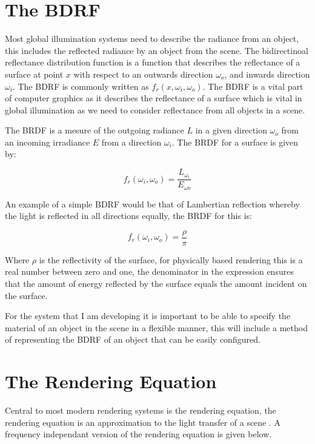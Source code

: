 \section{The BDRF}
\label{sec:bdrf}
Most global illumination systems need to describe the radiance from an object, this includes the
reflected radiance by an object from the scene.
The bidirectinoal reflectance distribution function \cite{Nicodemus65}is a function that describes 
the reflectance of a surface at point $x$ with respect to an outwards direction $\omega_{o}$, and 
inwards direction $\omega_{i}$. The BDRF is commonly written as $f_{r}(x, \omega_{i},\omega_{o})$. 
The BDRF is a vital part of computer graphics as it describes the reflectance of a surface which is 
vital in global illumination as we need to consider reflectance from all objects in a scene.

The BRDF is a mesure of the outgoing radiance $L$ in a given direction $\omega_{o}$ from an incoming
irradiance $E$ from a direction $\omega_{i}$. The BRDF for a surface is given by:

\begin{equation}
f_{r}(\omega_{i}, \omega_{o}) = \frac{L_{\omega_{i}}}{E_{\omega{o}}}
\end{equation}

An example of a simple BDRF would be that of Lambertian reflection whereby the light is reflected
in all directions equally, the BRDF for this is:

\begin{equation}
f_{r}(\omega_{i}, \omega_{o}) = \frac{\rho}{\pi}
\end{equation}

Where $\rho$ is the reflectivity of the surface, for physically based rendering this is a real
number between zero and one, the denominator in the expression ensures that the amount of
energy reflected by the surface equals the amount incident on the surface.

For the system that I am developing it is important to be able to specify the material of an
object in the scene in a flexible manner, this will include a method of representing the BDRF of
an object that can be easily configured.

\section{The Rendering Equation}
Central to most modern rendering systems is the rendering equation, the rendering equation is an
approximation to the light transfer of a scene \cite{Kajiya86}. A frequency independant version of
the rendering equation is given below.

